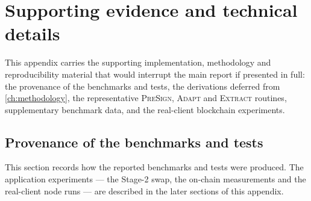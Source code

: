 \chapter{Supporting evidence and technical details}
\label{app:code}

This appendix carries the supporting implementation, methodology and reproducibility
material that would interrupt the main report if presented in full: the provenance of the benchmarks and tests, the derivations deferred from \cref{ch:methodology}, the
representative \textsc{PreSign}, \textsc{Adapt} and \textsc{Extract} routines,
supplementary benchmark data, and the real-client blockchain experiments.

\section{Provenance of the benchmarks and tests}
\label{app:repro}

This section records how the reported benchmarks and tests were produced. The application
experiments --- the Stage-2 swap, the on-chain measurements and the real-client node runs
--- are described in the later sections of this appendix.

